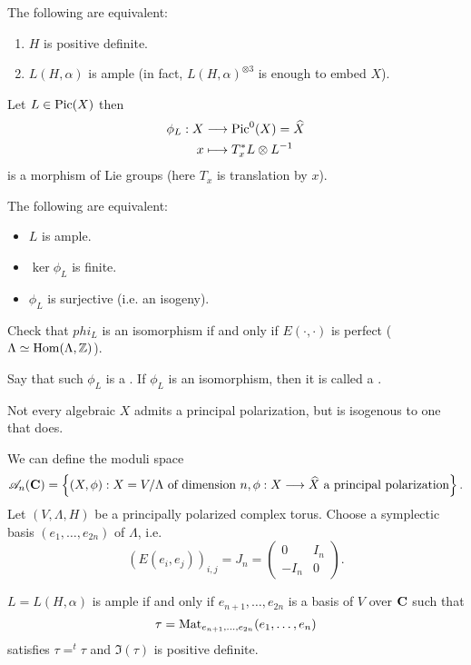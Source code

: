 \begin{theorem}[Lefschetz]
	The following are equivalent:
	\begin{enumerate}[1)]
		\item $H$ is positive definite.
		\item $L(H,\alpha)$ is ample (in fact, $L(H,\alpha)^{\otimes 3}$ is enough to embed $X$).
	\end{enumerate}
\end{theorem}
Let $L\in \operatorname{Pic}(X)$ then
\begin{align*}
	\phi_L: X &\longrightarrow \operatorname{Pic}^{0}(X) = \widehat{X} \\
	x &\longmapsto T_x^{*}L\otimes L^{-1}
\end{align*}
is a morphism of Lie groups (here $T_x$ is translation by $x$).

\begin{theorem}
	The following are equivalent:
	\begin{itemize}
		\item $L$ is ample.
		\item $\ker\phi_L$ is finite.
		\item $\phi_L$ is surjective (i.e. an isogeny).
	\end{itemize}
\end{theorem}
\begin{exercise}
	Check that $phi_L$ is an isomorphism if and only if $E(\cdot ,\cdot )$ is perfect ($\Lambda\simeq \operatorname{Hom}(\Lambda,\mathbb Z)$).
\end{exercise}
\begin{definition}
	Say that such $\phi_L$ is a . If $\phi_L$ is an isomorphism, then it is called a .
\end{definition}
\begin{remark}
	Not every algebraic $X$ admits a principal polarization, but is isogenous to one that does.
\end{remark}
We can define the moduli space
\[
	\CA_n(\C) = \left\{ (X,\phi):X = V /\Lambda\text{ of dimension }n,  \phi:X\to \wh{X}\text{ a principal polarization} \right\} 
.\] 
Let $(V,\Lambda,H)$ be a principally polarized complex torus. Choose a symplectic basis $(e_1,\dots,e_{2n})$ of $\Lambda$, i.e.
\[
	(E(e_i,e_j))_{i,j} = J_n = \begin{pmatrix} 0 & I_n \\ -I_n & 0 \end{pmatrix} 
.\] 
\begin{exercise}
	$L=L(H,\alpha)$ is ample if and only if $e_{n+1},\dots,e_{2n}$ is a basis of $V$ over $\mathbf{C}$ such that
	\[
	\tau = \operatorname{Mat}_{e_{n+1},\dots,e_{2n}}(e_1,\dots,e_n)
	\] 
	satisfies $\tau = ^{t}\tau$ and $\Im(\tau)$ is positive definite.
\end{exercise}
